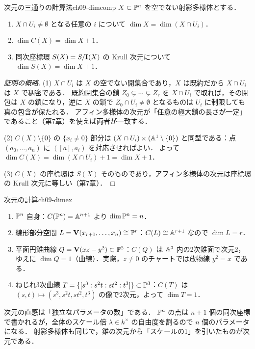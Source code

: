 \begin{myprop}{次元の三通りの計算法}{ch09-dimcomp}
$X\subset\mathbb{P}^n$ を空でない射影多様体とする．
\begin{enumerate}
  \item $X\cap U_i\neq\emptyset$ となる任意の $i$ について $\dim X=\dim(X\cap U_i)$．
  \item $\dim C(X)=\dim X+1$．
  \item 同次座標環 $S(X)=S/\mathbf{I}(X)$ の Krull 次元について $\dim S(X)=\dim X+1$．
\end{enumerate}
\end{myprop}

\begin{proof}[証明の概略]
(1) $X\cap U_i$ は $X$ の空でない開集合であり，$X$ は既約だから $X\cap U_i$ は $X$ で稠密である．
既約閉集合の鎖 $Z_0\subsetneq\cdots\subsetneq Z_r$ を $X\cap U_i$ で取れば，その閉包は $X$ の鎖になり，逆に $X$ の鎖で $Z_0\cap U_i\neq\emptyset$ となるものは $U_i$ に制限しても真の包含が保たれる．
アフィン多様体の次元が「任意の極大鎖の長さが一定」であること（第7章）を使えば両者が一致する．

(2) $C(X)\setminus\{0\}$ の $\{x_i\neq0\}$ 部分は $(X\cap U_i)\times(\mathbb{A}^1\setminus\{0\})$ と同型である：点 $(a_0,\dots,a_n)$ に $([a],a_i)$ を対応させればよい．
よって $\dim C(X)=\dim(X\cap U_i)+1=\dim X+1$．

(3) $C(X)$ の座標環は $S(X)$ そのものであり，アフィン多様体の次元は座標環の Krull 次元に等しい（第7章）．
\end{proof}

\begin{myex}{次元の計算}{ch09-dimex}
\begin{enumerate}
  \item $\mathbb{P}^n$ 自身：$C(\mathbb{P}^n)=\mathbb{A}^{n+1}$ より $\dim\mathbb{P}^n=n$．
  \item 線形部分空間 $L=\mathbf{V}(x_{r+1},\dots,x_n)\cong\mathbb{P}^r$：$C(L)\cong\mathbb{A}^{r+1}$ なので $\dim L=r$．
  \item 平面円錐曲線 $Q=\mathbf{V}(xz-y^2)\subset\mathbb{P}^2$：$C(Q)$ は $\mathbb{A}^3$ 内の2次錐面で次元2，ゆえに $\dim Q=1$（曲線）．実際，$z\neq0$ のチャートでは放物線 $y^2=x$ である．
  \item ねじれ3次曲線 $T=\{[s^3:s^2t:st^2:t^3]\}\subset\mathbb{P}^3$：$C(T)$ は $(s,t)\mapsto(s^3,s^2t,st^2,t^3)$ の像で2次元，よって $\dim T=1$．
\end{enumerate}
\end{myex}

次元の直感は「独立なパラメータの数」である．
$\mathbb{P}^n$ の点は $n+1$ 個の同次座標で書かれるが，全体のスケール倍 $\lambda\in k^\times$ の自由度を割るので $n$ 個のパラメータになる．
射影多様体も同じで，錐の次元から「スケールの1」を引いたものが次元である．

